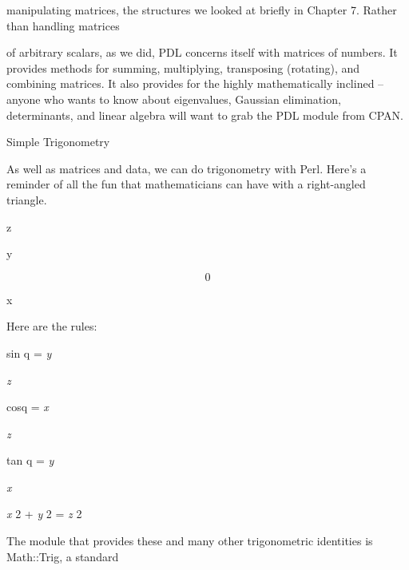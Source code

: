 \documentclass[a4paper,11pt]{book}
\begin{document}
\noindent manipulating matrices, the structures we looked at briefly in Chapter 7. Rather than handling matrices

\noindent of arbitrary scalars, as we did, PDL concerns itself with matrices of numbers. It provides methods for summing, multiplying, transposing (rotating), and combining matrices. It also provides for the highly mathematically inclined -- anyone who wants to know about eigenvalues, Gaussian elimination, determinants, and linear algebra will want to grab the PDL module from CPAN.

\noindent 

\noindent Simple Trigonometry

\noindent 

\noindent As well as matrices and data, we can do trigonometry with Perl. Here's a reminder of all the fun that mathematicians can have with a right-angled triangle.

\noindent 

\noindent 

\noindent 

\noindent 

\noindent 

\noindent 

z

\noindent y

\noindent 

\noindent 

\noindent 

\noindent 

\[0\] 


\noindent x

\noindent 

\noindent 

\noindent Here are the rules:

\noindent 

\noindent 

\noindent sin q =  \textit{y}

\noindent \textit{z}

\noindent cosq = \textit{x}

\noindent \textit{z}

\noindent tan q =  \textit{y}

\noindent \textit{x}

\noindent \textit{x }2  + \textit{y }2  = \textit{z }2

\noindent 

\noindent The module that provides these and many other trigonometric identities is Math::Trig, a standard
\end{document}
